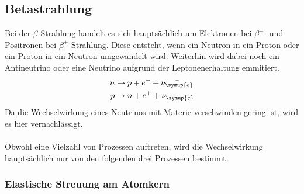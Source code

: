 \subsection{Betastrahlung}
\label{sec:Betastrahlung}
Bei der $\beta$-Strahlung handelt es sich hauptsächlich um Elektronen bei $\beta^{-}$- und Positronen bei
$\beta^{+}$-Strahlung. Diese entsteht, wenn ein Neutron in ein Proton oder ein Proton in ein Neutron umgewandelt
wird. Weiterhin wird dabei noch ein Antineutrino oder eine Neutrino aufgrund der Leptonenerhaltung emmitiert.
\begin{align*}
    n &\rightarrow p + e^{-} + \bar{\nu_{\symup{e}}}\\
    p &\rightarrow n + e^{+} + \nu_{\symup{e}}
\end{align*}
Da die Wechselwirkung eines Neutrinos mit Materie verschwinden gering ist, wird es hier vernachlässigt.\\
\\
Obwohl eine Vielzahl von Prozessen auftreten, wird die Wechselwirkung hauptsächlich nur von den folgenden
drei Prozessen bestimmt.

\subsubsection{Elastische Streuung am Atomkern}
\label{sec:elastischeStreuung}
